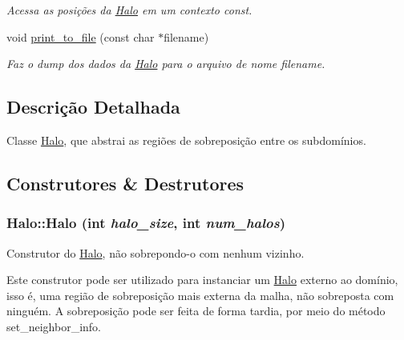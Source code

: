 \begin{DoxyCompactItemize}
\begin{DoxyCompactList}\small\item\em Acessa as posições da \hyperlink{classHalo}{Halo} em um contexto const. \item\end{DoxyCompactList}\item 
void \hyperlink{classHalo_a3db72b220e013aeb89be9b295f3def39}{print\_\-to\_\-file} (const char $\ast$filename)
\begin{DoxyCompactList}\small\item\em Faz o dump dos dados da \hyperlink{classHalo}{Halo} para o arquivo de nome filename. \item\end{DoxyCompactList}\end{DoxyCompactItemize}


\subsection{Descrição Detalhada}
Classe \hyperlink{classHalo}{Halo}, que abstrai as regiões de sobreposição entre os subdomínios. 

\subsection{Construtores \& Destrutores}
\hypertarget{classHalo_adab5e53317b1cf32558d66a1b8052ea0}{
\subsubsection[{Halo}]{\setlength{\rightskip}{0pt plus 5cm}Halo::Halo (int {\em halo\_\-size}, \/  int {\em num\_\-halos})}}
\label{classHalo_adab5e53317b1cf32558d66a1b8052ea0}


Construtor do \hyperlink{classHalo}{Halo}, não sobrepondo-\/o com nenhum vizinho. 

Este construtor pode ser utilizado para instanciar um \hyperlink{classHalo}{Halo} externo ao domínio, isso é, uma região de sobreposição mais externa da malha, não sobreposta com ninguém. A sobreposição pode ser feita de forma tardia, por meio do método set\_\-neighbor\_\-info.


